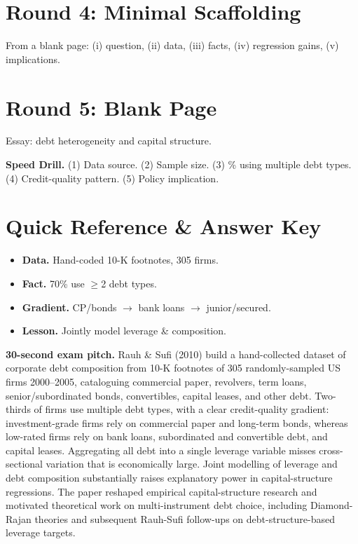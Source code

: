 \documentclass[11pt]{article}
\begin{document}
\section*{Round 4: Minimal Scaffolding}
From a blank page: (i) question, (ii) data, (iii) facts, (iv) regression gains, (v) implications.

\section*{Round 5: Blank Page}
Essay: debt heterogeneity and capital structure.

\vspace{6pt}
\begin{drillbox}
\textbf{Speed Drill.} (1) Data source. (2) Sample size. (3) \% using multiple debt types. (4) Credit-quality pattern. (5) Policy implication.
\end{drillbox}

\section*{Quick Reference \& Answer Key}
\begin{answerbox}
\begin{itemize}
\item \textbf{Data.} Hand-coded 10-K footnotes, 305 firms.
\item \textbf{Fact.} 70\% use $\geq$2 debt types.
\item \textbf{Gradient.} CP/bonds $\to$ bank loans $\to$ junior/secured.
\item \textbf{Lesson.} Jointly model leverage \& composition.
\end{itemize}
\end{answerbox}

\begin{keybox}
\textbf{30-second exam pitch.} Rauh \& Sufi (2010) build a hand-collected dataset of corporate debt composition from 10-K footnotes of 305 randomly-sampled US firms 2000--2005, cataloguing commercial paper, revolvers, term loans, senior/subordinated bonds, convertibles, capital leases, and other debt. Two-thirds of firms use multiple debt types, with a clear credit-quality gradient: investment-grade firms rely on commercial paper and long-term bonds, whereas low-rated firms rely on bank loans, subordinated and convertible debt, and capital leases. Aggregating all debt into a single leverage variable misses cross-sectional variation that is economically large. Joint modelling of leverage and debt composition substantially raises explanatory power in capital-structure regressions. The paper reshaped empirical capital-structure research and motivated theoretical work on multi-instrument debt choice, including Diamond-Rajan theories and subsequent Rauh-Sufi follow-ups on debt-structure-based leverage targets.
\end{keybox}
\end{document}
